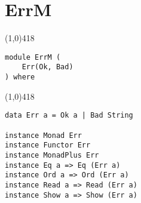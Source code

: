 \section{ErrM}
\begin{center}
\line(1,0){418}
\end{center}
\begin{verbatim}
module ErrM (
    Err(Ok, Bad)
) where
\end{verbatim}
\begin{center}
\line(1,0){418}
\end{center}
\begin{verbatim}
data Err a = Ok a | Bad String

instance Monad Err
instance Functor Err
instance MonadPlus Err
instance Eq a => Eq (Err a)
instance Ord a => Ord (Err a)
instance Read a => Read (Err a)
instance Show a => Show (Err a)
\end{verbatim}
